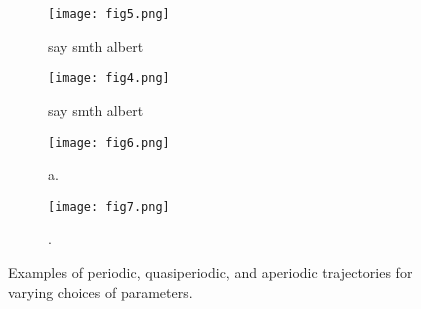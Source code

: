 \begin{figure}[!th]
\centering
\begin{subfigure}{0.49\textwidth}
\centering
\texttt{[image: fig5.png]}
\caption{say smth albert}
\label{subfig:periodicorbit1}
\end{subfigure}
%
\begin{subfigure}{0.49\textwidth}
\texttt{[image: fig4.png]}
\caption{say smth albert}
\label{subfig:periodicorbit2}
\end{subfigure}
%
\begin{subfigure}{0.49\textwidth}
\texttt{[image: fig6.png]}
\caption{a.}
\label{subfig:periodicorbit3}
\end{subfigure}
%
\begin{subfigure}{0.49\textwidth}
\texttt{[image: fig7.png]}
\caption{.}
\label{subfig:periodicorbit4}
\end{subfigure}
\caption{Examples of periodic, quasiperiodic, and aperiodic trajectories for varying choices of parameters.}
\label{fig:periodicorbits}
\end{figure}
